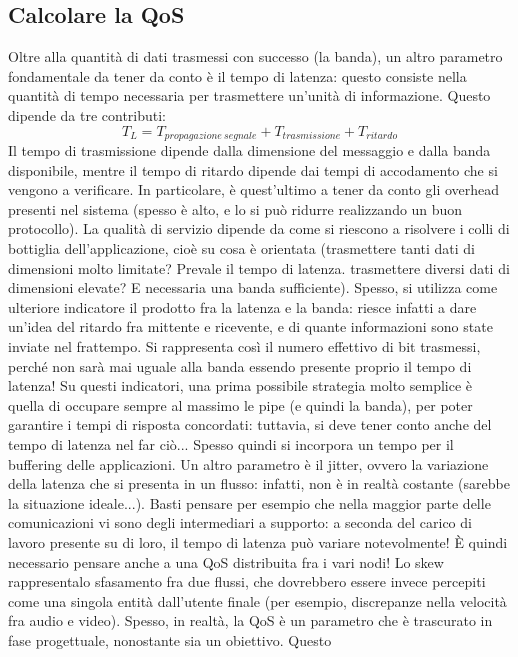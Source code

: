 \subsection{Calcolare la QoS}
Oltre alla quantità di dati trasmessi con successo (la banda), un altro parametro fondamentale da tener da conto è il
tempo di latenza: questo consiste nella quantità di tempo necessaria per trasmettere un'unità di informazione. Questo
dipende da tre contributi:
\begin{equation}
T_L = T_{propagazione\:segnale} + T_{trasmissione} + T_{ritardo}
\end{equation}
Il tempo di trasmissione dipende dalla dimensione del messaggio e dalla banda disponibile, mentre il tempo di ritardo
dipende dai tempi di accodamento che si vengono a verificare. In particolare, è quest'ultimo a tener da conto gli
overhead presenti nel sistema (spesso è alto, e lo si può ridurre realizzando un buon protocollo).
La qualità di servizio dipende da come si riescono a risolvere i colli di bottiglia dell'applicazione, cioè su cosa è
orientata (trasmettere tanti dati di dimensioni molto limitate? Prevale il tempo di latenza. trasmettere diversi dati
di dimensioni elevate? E necessaria una banda sufficiente). Spesso, si utilizza come ulteriore indicatore il prodotto
fra la latenza e la banda: riesce infatti a dare un'idea del ritardo fra mittente e ricevente, e di quante informazioni
sono state inviate nel frattempo. Si rappresenta così il numero effettivo di bit trasmessi, perché non sarà mai uguale
alla banda essendo presente proprio il tempo di latenza! Su questi indicatori, una prima possibile strategia molto
semplice è quella di occupare sempre al massimo le pipe (e quindi la banda), per poter garantire i tempi di risposta
concordati: tuttavia, si deve tener conto anche del tempo di latenza nel far ciò... Spesso quindi si incorpora un
tempo per il buffering delle applicazioni. Un altro parametro è il jitter, ovvero la variazione della latenza che si
presenta in un flusso: infatti, non è in realtà costante (sarebbe la situazione ideale...).
Basti pensare per esempio che nella maggior parte delle comunicazioni vi sono degli intermediari a supporto: a seconda
del carico di lavoro presente su di loro, il tempo di latenza può variare notevolmente! È quindi necessario pensare
anche a una QoS distribuita fra i vari nodi!
Lo skew rappresentalo sfasamento fra due flussi, che dovrebbero essere invece percepiti come una singola entità
dall'utente finale (per esempio, discrepanze nella velocità fra audio e video).
Spesso, in realtà, la QoS è un parametro che è trascurato in fase progettuale, nonostante sia un obiettivo. Questo
